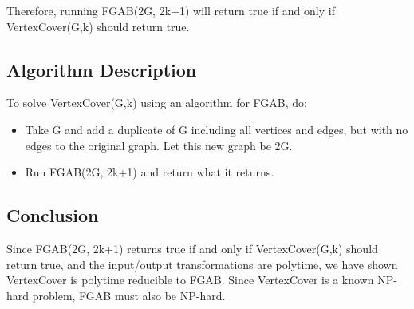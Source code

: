 \documentclass[a4paper]{article}
\begin{document}
Therefore, running FGAB(2G, 2k+1) will return true if and only if VertexCover(G,k) should return true.

\subsection{Algorithm Description}
To solve VertexCover(G,k) using an algorithm for FGAB, do:
\begin{itemize}
    \item Take G and add a duplicate of G including all vertices and edges, but with no edges to the original graph. Let this new graph be 2G.
    \item Run FGAB(2G, 2k+1) and return what it returns.
\end{itemize}

\subsection{Conclusion}
Since FGAB(2G, 2k+1) returns true if and only if VertexCover(G,k) should return true, and the input/output transformations are polytime, we have shown VertexCover is polytime reducible to FGAB. Since VertexCover is a known NP-hard problem, FGAB must also be NP-hard.
\end{document}
